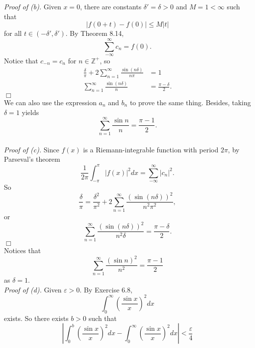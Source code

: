 \documentclass{article}
\begin{document}
\emph{Proof of (b).}
Given $x = 0$, there are constants $\delta' = \delta > 0$ and $M = 1 < \infty$ such that
$$|f(0 + t) - f(0)| \leq M|t|$$ for all $t \in (-\delta', \delta')$.
By Theorem 8.14,
$$\sum_{-\infty}^{\infty} c_n = f(0).$$
Notice that $c_{-n} = c_n$ for $n \in \mathbb{Z}^+$, so
\begin{align*}
\frac{\delta}{\pi} + 2 \sum_{n = 1}^{\infty} \frac{\sin(n \delta)}{n \pi}
&= 1 \\
\sum_{n = 1}^{\infty} \frac{\sin(n \delta)}{n}
&= \frac{\pi - \delta}{2}.
\end{align*}
$\Box$ \\

We can also use the expression $a_n$ and $b_n$ to prove the same thing.
Besides, taking $\delta = 1$ yields
$$\sum_{n = 1}^{\infty} \frac{\sin n}{n} = \frac{\pi - 1}{2}.$$ \\

\emph{Proof of (c).}
Since $f(x)$ is a Riemann-integrable function with period $2 \pi$,
by Parseval's theorem
$$\frac{1}{2 \pi} \int_{-\pi}^\pi |f(x)|^2 dx = \sum_{-\infty}^{\infty} |c_n|^2.$$
So
$$\frac{\delta}{\pi}
= \frac{\delta^2}{\pi^2} + 2 \sum_{n = 1}^{\infty} \frac{(\sin(n\delta))^2}{n^2 \pi^2}, $$
or
$$\sum_{n = 1}^{\infty} \frac{(\sin(n\delta))^2}{n^2 \delta}
= \frac{\pi - \delta}{2}.$$
$\Box$ \\

Notices that
$$\sum_{n = 1}^{\infty} \frac{(\sin n)^2}{n^2} = \frac{\pi - 1}{2}$$
as $\delta = 1$. \\

\emph{Proof of (d).}
Given $\varepsilon > 0$.
By Exercise 6.8,
$$\int_{0}^{\infty} \left( \frac{\sin x}{x} \right)^2 dx$$ exists.
So there exists $b > 0$ such that
$$\left| \int_{0}^{b} \left( \frac{\sin x}{x} \right)^2 dx
- \int_{0}^{\infty} \left( \frac{\sin x}{x} \right)^2 dx
\right| < \frac{\varepsilon}{4}$$
\end{document}
